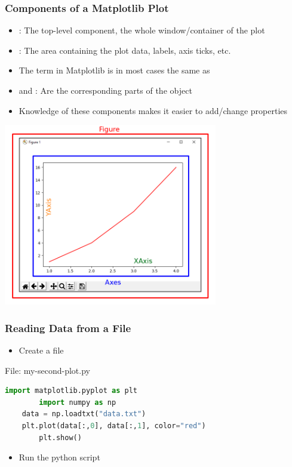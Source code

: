 \begin{frame}[fragile]
	\frametitle{Components of a Matplotlib Plot}
    \begin{itemize}
      \item {}: The top-level component, the whole window/container of the plot
      \item {}: The area containing the plot data, labels, axis ticks, etc. 
      \item The term  in Matplotlib is in most cases the same as  
      \item {} and : Are the corresponding parts of the  object
      \item Knowledge of these components makes it easier to add/change properties 
    \end{itemize}
\end{frame}

\begin{frame}[fragile]
   \vspace{-1cm}
    \begin{center}
      \includegraphics[width=0.7\textwidth]{screenshots/plt-3.png}
    \end{center}						
\end{frame}

\begin{frame}[fragile]
	\frametitle{Reading Data from a File}
    \begin{itemize}
      \item Create a file 
    \end{itemize}
    \begin{block}{File: my-second-plot.py}
    \begin{lstlisting}[language=Python]
    import matplotlib.pyplot as plt
		import numpy as np
    data = np.loadtxt("data.txt")
    plt.plot(data[:,0], data[:,1], color="red")
		plt.show()
    \end{lstlisting}      
		\end{block}		
    \begin{itemize}
      \item Run the python script 
    \end{itemize}			
\end{frame}

